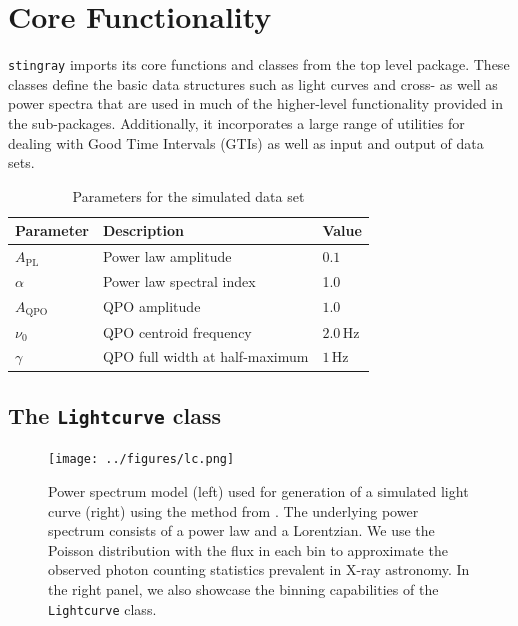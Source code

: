 \documentclass[12pt]{emulateapj}
\newcommand{\stingray}{\texttt{stingray}\xspace}
\begin{document}
\section{Core Functionality}
\label{sec:core}

\stingray imports its core functions and classes from the top level package. 
These classes define the basic data structures such as light curves and cross- as well as power spectra that are used in much of the higher-level functionality provided in the sub-packages. 
Additionally, it incorporates a large range of utilities for dealing with Good Time Intervals (GTIs) as well as input and output of data sets. 

\begin{table}[hbtp]
\footnotesize
\caption{Parameters for the simulated data set}
\begin{threeparttable} 
\begin{tabularx}{8.5cm}{p{2.5cm}p{4.0cm}p{2.0cm}}
\toprule
\bf{Parameter} & \bf{Description} &\bf{Value} \\ \midrule
$A_{\mathrm{PL}}$ & Power law amplitude & $0.1$ \\
$\alpha$ & Power law spectral index & 1.0 \\
$A_{\mathrm{QPO}}$ & QPO amplitude &  $1.0$ \\
$\nu_0$ & QPO centroid frequency & $2.0 \,\mathrm{Hz}$ \\
$\gamma$ & QPO full width at half-maximum &$1 \,\mathrm{Hz}$ \\
 \bottomrule
\end{tabularx}
   \begin{tablenotes}
      \item{}
\end{tablenotes}
\end{threeparttable}
\label{table:parameters}
\end{table}

\subsection{The \texttt{Lightcurve} class}
\label{sec:lightcurve}

\begin{figure}
\begin{center}
\texttt{[image: ../figures/lc.png]}
\caption{Power spectrum model (left) used for generation of a simulated light curve (right) using the method from \citet{timmer1995}. The underlying power spectrum consists of a power law and a Lorentzian. We use the Poisson distribution with the flux in each bin to approximate the observed photon counting statistics prevalent in X-ray astronomy. In the right panel, we also showcase the binning capabilities of the \texttt{Lightcurve} class.}
\label{fig:scores}
\end{center}
\end{figure}
\end{document}
